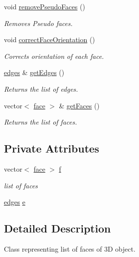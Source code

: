 \begin{DoxyCompactItemize}
void \mbox{\hyperlink{classfaces_a40dea4a75ea92a062b5a3fab8246269b}{remove\+Pseudo\+Faces}} ()
\begin{DoxyCompactList}\small\item\em Removes Pseudo faces. \end{DoxyCompactList}\item 
void \mbox{\hyperlink{classfaces_abdf6691e92a27f82d0ee45f7ab87a429}{correct\+Face\+Orientation}} ()
\begin{DoxyCompactList}\small\item\em Corrects orientation of each face. \end{DoxyCompactList}\item 
\mbox{\hyperlink{classedges}{edges}} \& \mbox{\hyperlink{classfaces_a0c3f9f40aa96dc960a4eb42408b50574}{get\+Edges}} ()
\begin{DoxyCompactList}\small\item\em Returns the list of edges. \end{DoxyCompactList}\item 
vector$<$ \mbox{\hyperlink{structface}{face}} $>$ \& \mbox{\hyperlink{classfaces_a4522c25dc2608217b6bebfe550ec79a5}{get\+Faces}} ()
\begin{DoxyCompactList}\small\item\em Returns the list of faces. \end{DoxyCompactList}\end{DoxyCompactItemize}
\subsection*{Private Attributes}
\begin{DoxyCompactItemize}
\item 
vector$<$ \mbox{\hyperlink{structface}{face}} $>$ \mbox{\hyperlink{classfaces_a66837134b8414721f7461840769bcc65}{f}}
\begin{DoxyCompactList}\small\item\em list of faces \end{DoxyCompactList}\item 
\mbox{\hyperlink{classedges}{edges}} \mbox{\hyperlink{classfaces_a7b0632e23cbcdf8cbcabdcaad85fda7b}{e}}
\end{DoxyCompactItemize}


\subsection{Detailed Description}
Class representing list of faces of 3D object. 

